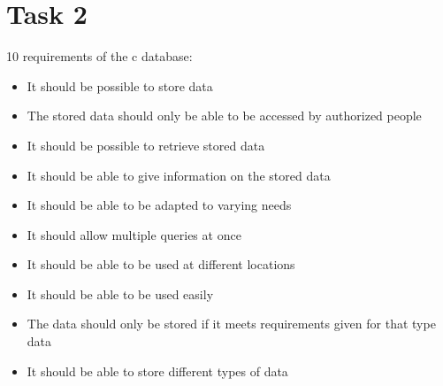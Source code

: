 \chapter{Task 2}
\begin{elenco}
10 requirements of the c database:
\begin{itemize}
    \item It should be possible to store data
    \item The stored data should only be able to be accessed by authorized people
    \item It should be possible to retrieve stored data
    \item It should be able to give information on the stored data
    \item It should be able to be adapted to varying needs
    \item It should allow multiple queries at once
    \item It should be able to be used at different locations
    \item It should be able to be used easily
    \item The data should only be stored if it meets requirements given for that type data
    \item It should be able to store different types of data
\end{itemize} 


\end{elenco}
